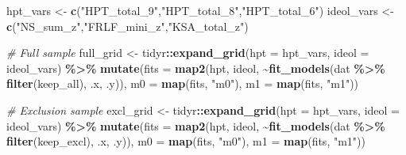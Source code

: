 \documentclass[
  10pt,
]{article}
\newenvironment{Shaded}{\begin{snugshade}}{\end{snugshade}}
\newcommand{\AttributeTok}[1]{\textcolor[rgb]{0.13,0.29,0.53}{#1}}
\newcommand{\CommentTok}[1]{\textcolor[rgb]{0.56,0.35,0.01}{\textit{#1}}}
\newcommand{\FunctionTok}[1]{\textcolor[rgb]{0.13,0.29,0.53}{\textbf{#1}}}
\newcommand{\NormalTok}[1]{#1}
\newcommand{\OtherTok}[1]{\textcolor[rgb]{0.56,0.35,0.01}{#1}}
\newcommand{\SpecialCharTok}[1]{\textcolor[rgb]{0.81,0.36,0.00}{\textbf{#1}}}
\newcommand{\StringTok}[1]{\textcolor[rgb]{0.31,0.60,0.02}{#1}}
\begin{document}
\begin{Shaded}
\begin{Highlighting}[]
\NormalTok{hpt\_vars   }\OtherTok{\textless{}{-}} \FunctionTok{c}\NormalTok{(}\StringTok{"HPT\_total\_9"}\NormalTok{,}\StringTok{"HPT\_total\_8"}\NormalTok{,}\StringTok{"HPT\_total\_6"}\NormalTok{)}
\NormalTok{ideol\_vars }\OtherTok{\textless{}{-}} \FunctionTok{c}\NormalTok{(}\StringTok{"NS\_sum\_z"}\NormalTok{,}\StringTok{"FRLF\_mini\_z"}\NormalTok{,}\StringTok{"KSA\_total\_z"}\NormalTok{)}

\CommentTok{\# Full sample}
\NormalTok{full\_grid }\OtherTok{\textless{}{-}}\NormalTok{ tidyr}\SpecialCharTok{::}\FunctionTok{expand\_grid}\NormalTok{(}\AttributeTok{hpt =}\NormalTok{ hpt\_vars, }\AttributeTok{ideol =}\NormalTok{ ideol\_vars) }\SpecialCharTok{\%\textgreater{}\%}
  \FunctionTok{mutate}\NormalTok{(}\AttributeTok{fits =} \FunctionTok{map2}\NormalTok{(hpt, ideol, }\SpecialCharTok{\textasciitilde{}}\FunctionTok{fit\_models}\NormalTok{(dat }\SpecialCharTok{\%\textgreater{}\%} \FunctionTok{filter}\NormalTok{(keep\_all), .x, .y)),}
         \AttributeTok{m0   =} \FunctionTok{map}\NormalTok{(fits, }\StringTok{"m0"}\NormalTok{),}
         \AttributeTok{m1   =} \FunctionTok{map}\NormalTok{(fits, }\StringTok{"m1"}\NormalTok{))}

\CommentTok{\# Exclusion sample}
\NormalTok{excl\_grid }\OtherTok{\textless{}{-}}\NormalTok{ tidyr}\SpecialCharTok{::}\FunctionTok{expand\_grid}\NormalTok{(}\AttributeTok{hpt =}\NormalTok{ hpt\_vars, }\AttributeTok{ideol =}\NormalTok{ ideol\_vars) }\SpecialCharTok{\%\textgreater{}\%}
  \FunctionTok{mutate}\NormalTok{(}\AttributeTok{fits =} \FunctionTok{map2}\NormalTok{(hpt, ideol, }\SpecialCharTok{\textasciitilde{}}\FunctionTok{fit\_models}\NormalTok{(dat }\SpecialCharTok{\%\textgreater{}\%} \FunctionTok{filter}\NormalTok{(keep\_excl), .x, .y)),}
         \AttributeTok{m0   =} \FunctionTok{map}\NormalTok{(fits, }\StringTok{"m0"}\NormalTok{),}
         \AttributeTok{m1   =} \FunctionTok{map}\NormalTok{(fits, }\StringTok{"m1"}\NormalTok{))}
\end{Highlighting}
\end{Shaded}
\end{document}
